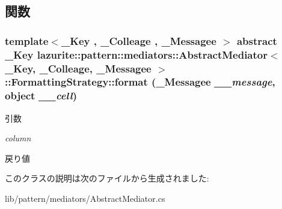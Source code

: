 \subsection{関数}
\hypertarget{classlazurite_1_1pattern_1_1mediators_1_1_abstract_mediator_3_01___key_00_01___colleage_00_01___05d0f5dbbad2bc6db18831464bc366e3_a5425830bd9719992ac7d8ea159fccab2}{
\subsubsection[{format}]{\setlength{\rightskip}{0pt plus 5cm}template$<$\_\-Key , \_\-Colleage , \_\-Messagee $>$ abstract \_\-Key lazurite::pattern::mediators::AbstractMediator$<$ \_\-Key, \_\-Colleage, \_\-Messagee $>$::FormattingStrategy::format (\_\-Messagee {\em \_\-\_\-message}, \/  object {\em \_\-\_\-cell})}}
\label{classlazurite_1_1pattern_1_1mediators_1_1_abstract_mediator_3_01___key_00_01___colleage_00_01___05d0f5dbbad2bc6db18831464bc366e3_a5425830bd9719992ac7d8ea159fccab2}

\begin{DoxyParams}{引数}
\item[{\em column}]\end{DoxyParams}
\begin{DoxyReturn}{戻り値}

\end{DoxyReturn}


このクラスの説明は次のファイルから生成されました:\begin{DoxyCompactItemize}
\item 
lib/pattern/mediators/AbstractMediator.cs\end{DoxyCompactItemize}
